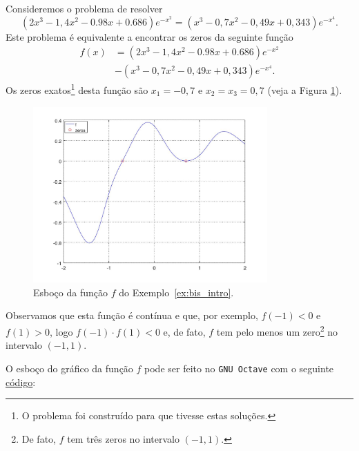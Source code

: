 \begin{ex}\label{ex:bis_intro}
  Consideremos o problema de resolver
  \begin{equation}
    (2x^3-1,4x^2-0.98x+0.686)e^{-x^2} = (x^3-0,7x^2-0,49x+0,343)e^{-x^4}.
  \end{equation}
Este problema é equivalente a encontrar os zeros da seguinte função
\begin{align}
  f(x) &= (2x^3-1,4x^2-0.98x+0.686)e^{-x^2} \nonumber\\
       &- (x^3-0,7x^2-0,49x+0,343)e^{-x^4}.
\end{align}
Os zeros exatos\footnote{O problema foi construído para que tivesse estas soluções.} desta função são $x_1=-0,7$ e $x_2=x_3=0,7$ (veja a Figura \ref{fig:bis_intro}).

\begin{figure}[h!]
  \centering
  \includegraphics[width=0.8\textwidth]{./cap_eq1d/dados/ex_bis_intro/fig_bis_intro}
  \caption{Esboço da função $f$ do Exemplo~\ref{ex:bis_intro}.}
  \label{fig:bis_intro}
\end{figure}

Observamos que esta função é contínua e que, por exemplo, $f(-1)<0$ e $f(1)>0$, logo $f(-1)\cdot f(1) < 0$ e, de fato, $f$ tem pelo menos um zero\footnote{De fato, $f$ tem três zeros no intervalo $(-1, 1)$.} no intervalo $(-1, 1)$.

\ifisoctave
O esboço do gráfico da função $f$ pode ser feito no \verb+GNU Octave+ com o seguinte \href{https://github.com/phkonzen/notas/blob/master/src/MatematicaNumerica/cap_eq1d/dados/ex_bis_intro/ex_bis_intro.m}{código}:

\fi
\end{ex}

